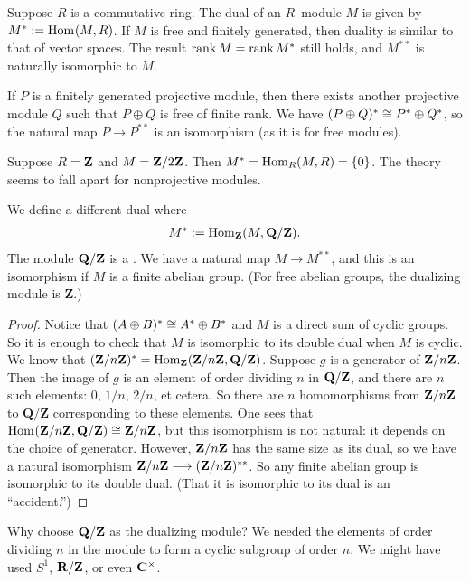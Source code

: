 \documentclass[11pt, oneside,margin=1in]{article}
\begin{document}
Suppose $R$ is a commutative ring. The dual of an $R$--module $M$ is given by $M^* := \operatorname{Hom}_{}(M, R)$. If $M$ is free and finitely generated, then duality is similar to that of vector spaces. The result $\operatorname{rank} M = \operatorname{rank} M^*$ still holds, and $M^{**}$ is naturally isomorphic to $M$. 

If $P$ is a finitely generated projective module, then there exists another projective module $Q$ such that $P\oplus Q$ is free of finite rank. We have $(P\oplus Q) ^* \cong P^* \oplus Q^*$, so the natural map $P\longrightarrow P^{**}$ is an isomorphism (as it is for free modules). 

Suppose $R=\mathbf Z$ and $M=\mathbf Z / 2\mathbf Z$. Then $M^* = \operatorname{Hom}_{R}(M, R)=\{0\}$. The theory seems to fall apart for nonprojective modules.

We define a different dual where
\begin{align*}
	M^* := \operatorname{Hom}_{\mathbf{Z}}(M, \mathbf{Q}/\mathbf{Z}).
\end{align*}
The module $\mathbf Q/\mathbf Z$ is a . We have a natural map $M\longrightarrow M^{**}$, and this is an isomorphism if $M$ is a finite abelian group. (For free abelian groups, the dualizing module is $\mathbf{Z}$.) 
\begin{proof}
Notice that $(A\oplus B) ^* \cong A^*\oplus B^*$ and $M$ is a direct sum of cyclic groups. So it is enough to check that $M$ is isomorphic to its double dual when $M$ is cyclic. We know that $(\mathbf Z / n\mathbf Z) ^* = \operatorname{Hom}_{\mathbf{Z}}(\mathbf Z / n\mathbf Z, \mathbf Q/\mathbf Z)$. Suppose $g$ is a generator of $\mathbf Z / n\mathbf Z$. Then the image of $g$ is an element of order dividing $n$ in $\mathbf Q/\mathbf Z$, and there are $n$ such elements: $0$, $1/n$, $2/n$, et cetera. So there are $n$ homomorphisms from $\mathbf Z / n\mathbf Z$ to $\mathbf{Q}/\mathbf{Z}$ corresponding to these elements. One sees that $\operatorname{Hom}_{}(\mathbf Z / n\mathbf Z, \mathbf Q/\mathbf Z)\cong \mathbf Z / n\mathbf Z$, but this isomorphism is not natural: it depends on the choice of generator. However, $\mathbf Z / n\mathbf Z$ has the same size as its dual, so we have a natural isomorphism $\mathbf Z / n\mathbf Z \longrightarrow (\mathbf Z / n\mathbf Z) ^{**}$. So any finite abelian group is isomorphic to its double dual. (That it is isomorphic to its dual is an ``accident.'') 
\end{proof}

Why choose $\mathbf Q/\mathbf Z$ as the dualizing module? We needed the elements of order dividing $n$ in the module to form a cyclic subgroup of order $n$. We might have used $S^1$, $\mathbf R/\mathbf Z$, or even $\mathbf C^\times$.
\end{document}
